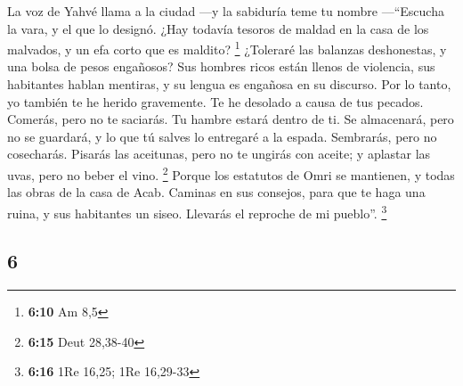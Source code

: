 \begin{paracol}{2}
 La voz de Yahvé llama a la ciudad ---y la sabiduría teme
tu nombre ---``Escucha la vara, y el que lo designó. 
¿Hay todavía tesoros de maldad en la casa de los malvados, y un efa
corto que es maldito? \footnote{\textbf{6:10} Am 8,5} 
¿Toleraré las balanzas deshonestas, y una bolsa de pesos engañosos?
 Sus hombres ricos están llenos de violencia, sus
habitantes hablan mentiras, y su lengua es engañosa en su discurso.
 Por lo tanto, yo también te he herido gravemente. Te he
desolado a causa de tus pecados.  Comerás, pero no te
saciarás. Tu hambre estará dentro de ti. Se almacenará, pero no se
guardará, y lo que tú salves lo entregaré a la espada. 
Sembrarás, pero no cosecharás. Pisarás las aceitunas, pero no te ungirás
con aceite; y aplastar las uvas, pero no beber el vino. \footnote{\textbf{6:15}
  Deut 28,38-40}  Porque los estatutos de Omri se
mantienen, y todas las obras de la casa de Acab. Caminas en sus
consejos, para que te haga una ruina, y sus habitantes un siseo.
Llevarás el reproche de mi pueblo''. \footnote{\textbf{6:16} 1Re 16,25;
  1Re 16,29-33}

\switchcolumn
\begin{otherlanguage}{english}

\hypertarget{section-11}{%
\section{6}\label{section-11}}


\end{otherlanguage}
\end{paracol}
